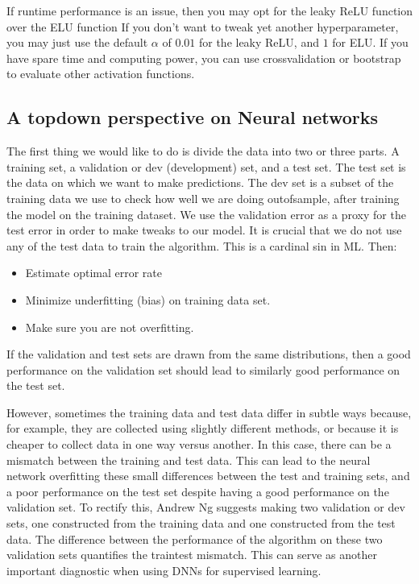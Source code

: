 \documentclass[letterpaper,10pt,english]{sphinxmanual}
\begin{document}
If runtime
performance is an issue, then you may opt for the  leaky ReLU function  over the
ELU function If you don’t
want to tweak yet another hyperparameter, you may just use the default
\(\alpha\) of \(0.01\) for the leaky ReLU, and \(1\) for ELU. If you have
spare time and computing power, you can use cross\sphinxhyphen{}validation or
bootstrap to evaluate other activation functions.


\subsection{A top\sphinxhyphen{}down perspective on Neural networks}
\label{\detokenize{chapter6:a-top-down-perspective-on-neural-networks}}
The first thing we would like to do is divide the data into two or three
parts. A training set, a validation or dev (development) set, and a
test set. The test set is the data on which we want to make
predictions. The dev set is a subset of the training data we use to
check how well we are doing out\sphinxhyphen{}of\sphinxhyphen{}sample, after training the model on
the training dataset. We use the validation error as a proxy for the
test error in order to make tweaks to our model. It is crucial that we
do not use any of the test data to train the algorithm. This is a
cardinal sin in ML. Then:
\begin{itemize}
\item {} 
Estimate optimal error rate

\item {} 
Minimize underfitting (bias) on training data set.

\item {} 
Make sure you are not overfitting.

\end{itemize}

If the validation and test sets are drawn from the same distributions,
then a good performance on the validation set should lead to similarly
good performance on the test set.

However, sometimes
the training data and test data differ in subtle ways because, for
example, they are collected using slightly different methods, or
because it is cheaper to collect data in one way versus another. In
this case, there can be a mismatch between the training and test
data. This can lead to the neural network overfitting these small
differences between the test and training sets, and a poor performance
on the test set despite having a good performance on the validation
set. To rectify this, Andrew Ng suggests making two validation or dev
sets, one constructed from the training data and one constructed from
the test data. The difference between the performance of the algorithm
on these two validation sets quantifies the train\sphinxhyphen{}test mismatch. This
can serve as another important diagnostic when using DNNs for
supervised learning.
\end{document}

